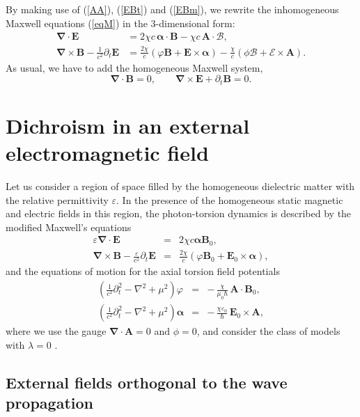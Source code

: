 \documentclass[12pt,prd,showkeys,amsmath,amssymb,nofootinbib]{revtex4-1}
\begin{document}
By making use of (\ref{AA}), (\ref{EBt}) and (\ref{EBm}), we rewrite the inhomogeneous Maxwell equations (\ref{eqM}) in the 3-dimensional form:
\begin{align}
\bm{\nabla}\cdot\bm{E} &= 2\chi c\,\bm{\alpha}\cdot\bm{B}
- \chi c\,\bm{A}\cdot\bm{\mathcal B},\label{eqM1}\\
\bm{\nabla}\times\bm{B} - {\frac 1{c^2}}\partial_t\bm{E} &= 
{\frac{2\chi}{c}}\left(\varphi\bm{B} + \bm{E}\times\bm{\alpha}\right) -
{\frac{\chi}{c}}\left(\phi\bm{\mathcal B} + \bm{\mathcal E}\times\bm{A}\right).\label{eqM2}
\end{align}
As usual, we have to add the homogeneous Maxwell system,
\begin{equation}
\bm{\nabla}\cdot\bm{B} = 0,\qquad
\bm{\nabla}\times\bm{E} + \partial_t\bm{B} = 0.\label{eqMh2}
\end{equation}


\section{Dichroism in an external electromagnetic field}


Let us consider a region of space filled by the homogeneous dielectric matter with the relative permittivity $\varepsilon$. In the presence of the homogeneous static magnetic and electric fields in this region, the photon-torsion dynamics is described by the modified Maxwell's equations
\begin{eqnarray}\label{Eq1}
\varepsilon\bm{\nabla}\cdot\bm{E} &=& 2\chi c \bm{\alpha}\bm{B}_0,\\ 
\bm{\nabla}\times\bm{B} - \frac{\varepsilon}{c^2}\partial_t\bm{E}
&=& \frac{2\chi}{c}\left(\varphi\bm{B}_0+\bm{E}_0\times\bm{\alpha}\right),
\end{eqnarray}
and the equations of motion for the axial torsion field potentials
\begin{eqnarray}
\left(\frac{1}{c^2}\partial^2_t-\nabla^2+\mu^2\right)\varphi
&=& -\,{\frac{\chi}{\mu_0\hbar}}\,\bm{A}\cdot\bm{B}_0,\label{Eq2}\\
\left(\frac{1}{c^2}\partial^2_t-\nabla^2+\mu^2\right)\bm{\alpha}
&=& -\,{\frac{\chi\varepsilon_0}{\hbar}}\,\bm{E}_0\times\bm{A},\label{Eq3}
\end{eqnarray}
where we use the gauge $\bm{\nabla}\cdot\bm{A} = 0$ and $\phi=0$, and consider the class of models with $\lambda = 0$ \cite{Yakushin2}.


\subsection{External fields orthogonal to the wave propagation}
\end{document}
